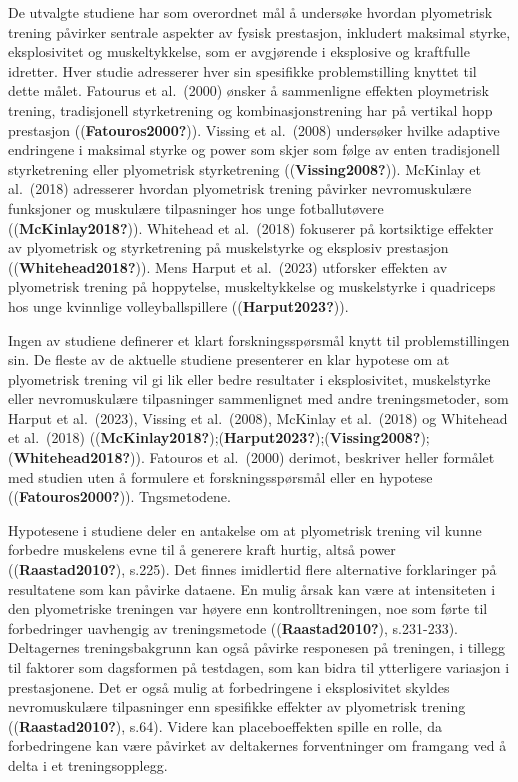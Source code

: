 \documentclass[
  letterpaper,
  DIV=11,
  numbers=noendperiod]{scrreprt}
\begin{document}
De utvalgte studiene har som overordnet mål å undersøke hvordan
plyometrisk trening påvirker sentrale aspekter av fysisk prestasjon,
inkludert maksimal styrke, eksplosivitet og muskeltykkelse, som er
avgjørende i eksplosive og kraftfulle idretter. Hver studie adresserer
hver sin spesifikke problemstilling knyttet til dette målet. Fatourus et
al.~(2000) ønsker å sammenligne effekten ploymetrisk trening,
tradisjonell styrketrening og kombinasjonstrening har på vertikal hopp
prestasjon ((\textbf{Fatouros2000?})). Vissing et al.~(2008) undersøker
hvilke adaptive endringene i maksimal styrke og power som skjer som
følge av enten tradisjonell styrketrening eller plyometrisk
styrketrening ((\textbf{Vissing2008?})). McKinlay et al.~(2018)
adresserer hvordan plyometrisk trening påvirker nevromuskulære
funksjoner og muskulære tilpasninger hos unge fotballutøvere
((\textbf{McKinlay2018?})). Whitehead et al.~(2018) fokuserer på
kortsiktige effekter av plyometrisk og styrketrening på muskelstyrke og
eksplosiv prestasjon ((\textbf{Whitehead2018?})). Mens Harput et
al.~(2023) utforsker effekten av plyometrisk trening på hoppytelse,
muskeltykkelse og muskelstyrke i quadriceps hos unge kvinnlige
volleyballspillere ((\textbf{Harput2023?})).

Ingen av studiene definerer et klart forskningsspørsmål knytt til
problemstillingen sin. De fleste av de aktuelle studiene presenterer en
klar hypotese om at plyometrisk trening vil gi lik eller bedre
resultater i eksplosivitet, muskelstyrke eller nevromuskulære
tilpasninger sammenlignet med andre treningsmetoder, som Harput et
al.~(2023), Vissing et al.~(2008), McKinlay et al.~(2018) og Whitehead
et al.~(2018)
((\textbf{McKinlay2018?});(\textbf{Harput2023?});(\textbf{Vissing2008?});(\textbf{Whitehead2018?})).
Fatouros et al.~(2000) derimot, beskriver heller formålet med studien
uten å formulere et forskningsspørsmål eller en hypotese
((\textbf{Fatouros2000?})). Tngsmetodene.

Hypotesene i studiene deler en antakelse om at plyometrisk trening vil
kunne forbedre muskelens evne til å generere kraft hurtig, altså power
((\textbf{Raastad2010?}), s.225). Det finnes imidlertid flere
alternative forklaringer på resultatene som kan påvirke dataene. En
mulig årsak kan være at intensiteten i den plyometriske treningen var
høyere enn kontrolltreningen, noe som førte til forbedringer uavhengig
av treningsmetode ((\textbf{Raastad2010?}), s.231-233). Deltagernes
treningsbakgrunn kan også påvirke responesen på treningen, i tillegg til
faktorer som dagsformen på testdagen, som kan bidra til ytterligere
variasjon i prestasjonene. Det er også mulig at forbedringene i
eksplosivitet skyldes nevromuskulære tilpasninger enn spesifikke
effekter av plyometrisk trening ((\textbf{Raastad2010?}), s.64). Videre
kan placeboeffekten spille en rolle, da forbedringene kan være påvirket
av deltakernes forventninger om framgang ved å delta i et
treningsopplegg.
\end{document}
